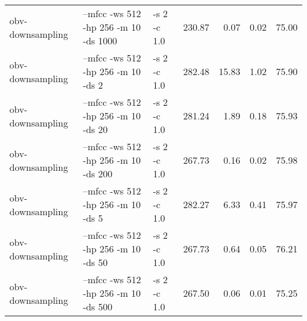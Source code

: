 \documentclass[11pt,a4paper]{article}
\begin{document}
\begin{tabular}{lllrrrr}
 obv-downsampling  &  --mfcc -ws 512 -hp 256 -m 10 -ds 1000    &  -s 2 -c 1.0  &  230.87  &   0.07  &  0.02  &  75.00  \\
 obv-downsampling  &  --mfcc -ws 512 -hp 256 -m 10 -ds 2       &  -s 2 -c 1.0  &  282.48  &  15.83  &  1.02  &  75.90  \\
 obv-downsampling  &  --mfcc -ws 512 -hp 256 -m 10 -ds 20      &  -s 2 -c 1.0  &  281.24  &   1.89  &  0.18  &  75.93  \\
 obv-downsampling  &  --mfcc -ws 512 -hp 256 -m 10 -ds 200     &  -s 2 -c 1.0  &  267.73  &   0.16  &  0.02  &  75.98  \\
 obv-downsampling  &  --mfcc -ws 512 -hp 256 -m 10 -ds 5       &  -s 2 -c 1.0  &  282.27  &   6.33  &  0.41  &  75.97  \\
 obv-downsampling  &  --mfcc -ws 512 -hp 256 -m 10 -ds 50      &  -s 2 -c 1.0  &  267.73  &   0.64  &  0.05  &  76.21  \\
 obv-downsampling  &  --mfcc -ws 512 -hp 256 -m 10 -ds 500     &  -s 2 -c 1.0  &  267.50  &   0.06  &  0.01  &  75.25  \\
\end{tabular}
\end{document}
